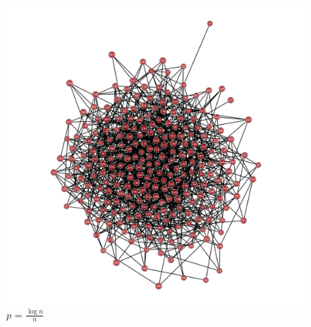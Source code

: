 \documentclass{article}
\begin{document}
\begin{figure}[!htb]
  \caption*{$p$ $\geq$ $\frac{1+\epsilon}{n}$}
\endminipage\hfill
{}%
  \includegraphics[width=\linewidth]{ER_Examples/ER_DN.png}
  \caption*{$p$ = $\frac{\log{}n}{n}$}
\endminipage
\end{figure}
\end{document}
